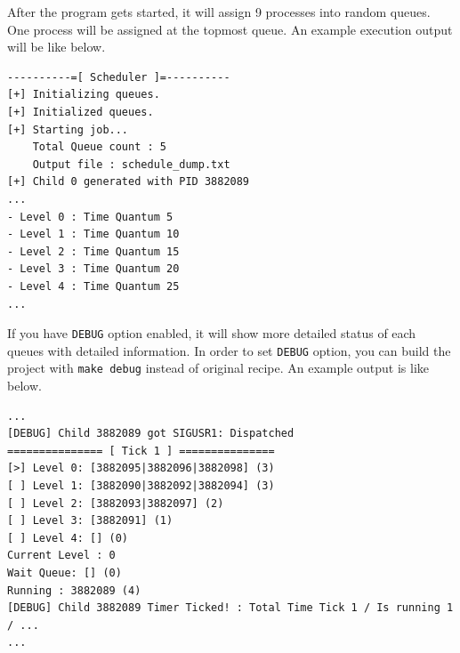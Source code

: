 \documentclass{homework}
\begin{document}
After the program gets started, it will assign 9 processes into random queues. One process will be assigned at the topmost queue. An example execution output will be like below.
\\
\begin{center}
\begin{code}
\begin{verbatim}
----------=[ Scheduler ]=----------
[+] Initializing queues.
[+] Initialized queues.
[+] Starting job...
    Total Queue count : 5
    Output file : schedule_dump.txt
[+] Child 0 generated with PID 3882089
...
- Level 0 : Time Quantum 5
- Level 1 : Time Quantum 10
- Level 2 : Time Quantum 15
- Level 3 : Time Quantum 20
- Level 4 : Time Quantum 25
...
\end{verbatim}
\end{code}
\end{center}
\pagebreak
If you have \texttt{DEBUG} option enabled, it will show more detailed status of each queues with detailed information. In order to set \texttt{DEBUG} option, you can build the project with \texttt{make debug} instead of original recipe. An example output is like below.
\\
\begin{center}
\begin{code}
\begin{verbatim}
...
[DEBUG] Child 3882089 got SIGUSR1: Dispatched
=============== [ Tick 1 ] ===============
[>] Level 0: [3882095|3882096|3882098] (3)
[ ] Level 1: [3882090|3882092|3882094] (3)
[ ] Level 2: [3882093|3882097] (2)
[ ] Level 3: [3882091] (1)
[ ] Level 4: [] (0)
Current Level : 0
Wait Queue: [] (0)
Running : 3882089 (4)
[DEBUG] Child 3882089 Timer Ticked! : Total Time Tick 1 / Is running 1 / ...
...
\end{verbatim}
\end{code}
\end{center}
\end{document}
